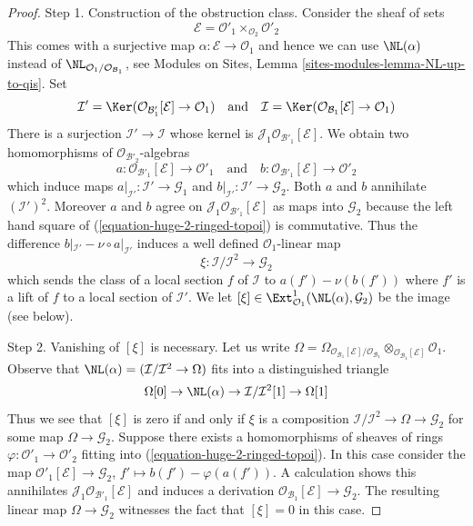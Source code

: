 \begin{proof}
\medskip\noindent
Step 1. Construction of the obstruction class. Consider the sheaf
of sets
$$
\mathcal{E} = \mathcal{O}'_1 \times_{\mathcal{O}_2} \mathcal{O}'_2
$$
This comes with a surjective map $\alpha : \mathcal{E} \to \mathcal{O}_1$
and hence we can use $\NL(\alpha)$ instead of
$\NL_{\mathcal{O}_1/\mathcal{O}_{\mathcal{B}_1}}$, see
Modules on Sites, Lemma \ref{sites-modules-lemma-NL-up-to-qis}.
Set
$$
\mathcal{I}' =
\Ker(\mathcal{O}_{\mathcal{B}'_1}[\mathcal{E}] \to \mathcal{O}_1)
\quad\text{and}\quad
\mathcal{I} =
\Ker(\mathcal{O}_{\mathcal{B}_1}[\mathcal{E}] \to \mathcal{O}_1)
$$
There is a surjection $\mathcal{I}' \to \mathcal{I}$ whose kernel
is $\mathcal{J}_1\mathcal{O}_{\mathcal{B}'_1}[\mathcal{E}]$.
We obtain two homomorphisms of $\mathcal{O}_{\mathcal{B}'_2}$-algebras
$$
a : \mathcal{O}_{\mathcal{B}'_1}[\mathcal{E}] \to \mathcal{O}'_1
\quad\text{and}\quad
b : \mathcal{O}_{\mathcal{B}'_1}[\mathcal{E}] \to \mathcal{O}'_2
$$
which induce maps $a|_{\mathcal{I}'} : \mathcal{I}' \to \mathcal{G}_1$ and
$b|_{\mathcal{I}'} : \mathcal{I}' \to \mathcal{G}_2$. Both $a$ and $b$
annihilate $(\mathcal{I}')^2$. Moreover $a$ and $b$ agree on
$\mathcal{J}_1\mathcal{O}_{\mathcal{B}'_1}[\mathcal{E}]$
as maps into $\mathcal{G}_2$
because the left hand square of (\ref{equation-huge-2-ringed-topoi})
is commutative. Thus the difference
$b|_{\mathcal{I}'} - \nu \circ a|_{\mathcal{I}'}$
induces a well defined $\mathcal{O}_1$-linear map
$$
\xi : \mathcal{I}/\mathcal{I}^2 \longrightarrow \mathcal{G}_2
$$
which sends the class of a local section $f$ of $\mathcal{I}$ to
$a(f') - \nu(b(f'))$ where $f'$ is a lift of $f$ to a local
section of $\mathcal{I}'$. We let
$[\xi] \in \Ext^1_{\mathcal{O}_1}(\NL(\alpha), \mathcal{G}_2)$
be the image (see below).

\medskip\noindent
Step 2. Vanishing of $[\xi]$ is necessary. Let us write $\Omega =
\Omega_{\mathcal{O}_{\mathcal{B}_1}[\mathcal{E}]/\mathcal{O}_{\mathcal{B}_1}}
\otimes_{\mathcal{O}_{\mathcal{B}_1}[\mathcal{E}]} \mathcal{O}_1$.
Observe that $\NL(\alpha) = (\mathcal{I}/\mathcal{I}^2 \to \Omega)$
fits into a distinguished triangle
$$
\Omega[0] \to
\NL(\alpha) \to
\mathcal{I}/\mathcal{I}^2[1] \to
\Omega[1]
$$
Thus we see that $[\xi]$ is zero if and only if $\xi$
is a composition $\mathcal{I}/\mathcal{I}^2 \to \Omega \to \mathcal{G}_2$
for some map $\Omega \to \mathcal{G}_2$. Suppose there exists a
homomorphisms of sheaves of rings
$\varphi : \mathcal{O}'_1 \to \mathcal{O}'_2$ fitting into
(\ref{equation-huge-2-ringed-topoi}). In this case consider the map
$\mathcal{O}'_1[\mathcal{E}] \to \mathcal{G}_2$,
$f' \mapsto b(f') - \varphi(a(f'))$. A calculation
shows this annihilates $\mathcal{J}_1\mathcal{O}_{\mathcal{B}'_1}[\mathcal{E}]$
and induces a derivation
$\mathcal{O}_{\mathcal{B}_1}[\mathcal{E}] \to \mathcal{G}_2$.
The resulting linear map $\Omega \to \mathcal{G}_2$ witnesses the
fact that $[\xi] = 0$ in this case.


\end{proof}
